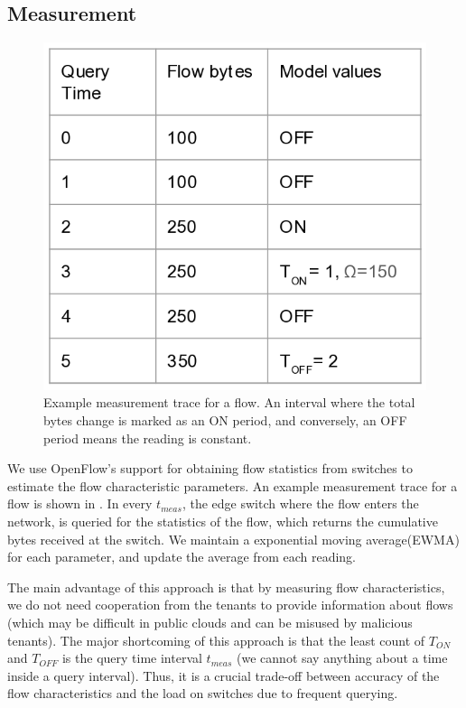\subsection{Measurement}
\begin{figure}[h!]
	\centering
	\includegraphics[width=\columnwidth]{meastrace.png}
	\caption{Example measurement trace for a flow. An interval where the total bytes change 
		is marked as an ON period, and conversely, an OFF period means the reading is constant.}
	\label{fig:meastrace}
\end{figure}
We use OpenFlow's support for obtaining flow statistics from 
switches to estimate the flow characteristic parameters. An example
measurement trace for a flow is shown in . In
every $t_{meas}$, the edge switch where the flow enters the network,
 is queried for the statistics of the 
flow, which returns the cumulative bytes received at the switch. We maintain
a exponential moving average(EWMA) for each parameter, and update the average
from each reading. 

The main advantage of this approach is that by measuring flow
characteristics, we do not need cooperation from the tenants to provide information about
flows (which may be difficult in public clouds and can be misused by malicious tenants). The 
major shortcoming of this approach is that the least count of $T_{ON}$ and $T_{OFF}$ is
the query time interval $t_{meas}$ (we cannot say anything about a time inside a query interval).
Thus, it is a crucial trade-off between accuracy of the flow characteristics and the load on switches
due to frequent querying. 

